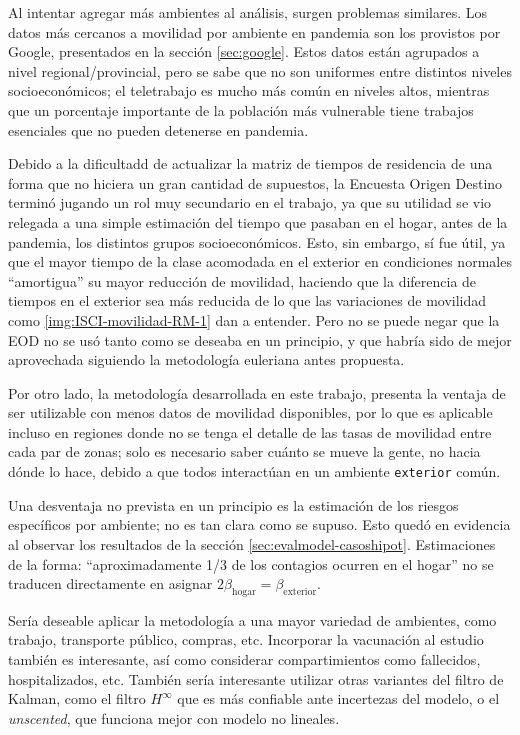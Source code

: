 Al intentar agregar más ambientes al análisis, surgen problemas similares. Los datos más cercanos a movilidad por ambiente en pandemia son los provistos por Google, presentados en la sección \ref{sec:google}. Estos datos están agrupados a nivel regional/provincial, pero se sabe \cite{Olivares2020} que no son uniformes entre distintos niveles socioeconómicos; el teletrabajo es mucho más común en niveles altos, mientras que un porcentaje importante de la población más vulnerable tiene trabajos esenciales que no pueden detenerse en pandemia.

Debido a la dificultadd de actualizar la matriz de tiempos de residencia de una forma que no hiciera un gran cantidad de supuestos, la Encuesta Origen Destino terminó jugando un rol muy secundario en el trabajo, ya que su utilidad se vio relegada a una simple estimación del tiempo que pasaban en el hogar, antes de la pandemia, los distintos grupos socioeconómicos. Esto, sin embargo, sí fue útil, ya que el mayor tiempo de la clase acomodada en el exterior en condiciones normales ``amortigua'' su mayor reducción de movilidad, haciendo que la diferencia de tiempos en el exterior sea más reducida de lo que las variaciones de movilidad como \ref{img:ISCI-movilidad-RM-1} dan a entender. Pero no se puede negar que la EOD no se usó tanto como se deseaba en un principio, y que habría sido de mejor aprovechada siguiendo la metodología euleriana antes propuesta.

Por otro lado, la metodología desarrollada en este trabajo, presenta la ventaja de ser utilizable con menos datos de movilidad disponibles, por lo que es aplicable incluso en regiones donde no se tenga el detalle de las tasas de movilidad entre cada par de zonas; solo es necesario saber cuánto se mueve la gente, no hacia dónde lo hace, debido a que todos interactúan en un ambiente \texttt{exterior} común.

Una desventaja no prevista en un principio es la estimación de los riesgos específicos por ambiente; no es tan clara como se supuso. Esto quedó en evidencia al observar los resultados de la sección \ref{sec:evalmodel-casoshipot}. Estimaciones de la forma: ``aproximadamente 1/3 de los contagios ocurren en el hogar'' \cite{Ferguson2020} no se traducen directamente en asignar \( 2 \beta_{\text{hogar}} = \beta_{\text{exterior}}\).

Sería deseable aplicar la metodología a una mayor variedad de ambientes, como trabajo, transporte público, compras, etc. Incorporar la vacunación al estudio también es interesante, así como considerar compartimientos como fallecidos, hospitalizados, etc. También sería interesante utilizar otras variantes del filtro de Kalman, como el filtro \(H^{\infty}\) que es más confiable ante incertezas del modelo, o el \textit{unscented}, que funciona mejor con modelo no lineales.

